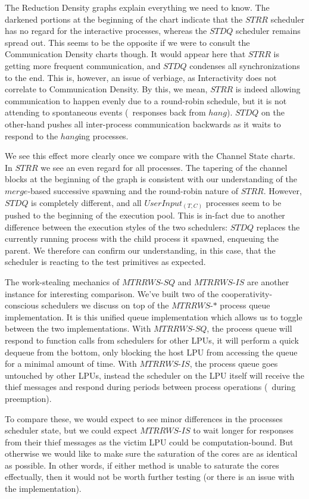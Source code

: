 The Reduction Density graphs explain everything we need to know. The darkened portions
at the beginning of the chart indicate that the $STRR$ scheduler has no regard for the
interactive processes, whereas the $STDQ$ scheduler remains spread out. This seems to be
the opposite if we were to consult the Communication Density charts though. It would appear
here that $STRR$ is getting more frequent communication, and $STDQ$ condenses all 
synchronizations to the end. This is, however, an issue of verbiage, as Interactivity
does not correlate to Communication Density. By this, we mean, $STRR$ is indeed allowing 
communication to happen evenly due to a round-robin schedule, but it is not attending to
spontaneous events (\ie~responses back from $hang$). $STDQ$ on the other-hand pushes all 
inter-process communication backwards as it waits to respond to the $hang$ing processes.

We see this effect more clearly once we compare with the Channel State charts. In $STRR$
we see an even regard for all processes. The tapering of the channel blocks at the 
beginning of the graph is consistent with our understanding of the $merge$-based
successive spawning and the round-robin nature of $STRR$. 
However, $STDQ$ is completely different, and all $UserInput_{(T,C)}$
processes seem to be pushed to the beginning of the execution pool. This is in-fact due
to another difference between the execution styles of the two schedulers: $STDQ$ replaces
the currently running process with the child process it spawned, enqueuing the parent.
We therefore can confirm our understanding, in this case, that the scheduler is reacting
to the test primitives as expected.

The work-stealing mechanics of $MTRRWS$-$SQ$ and $MTRRWS$-$IS$ are another instance for interesting comparison. We've built
two of the cooperativity-conscious schedulers we discuss on top of the $MTRRWS$-$*$ 
process queue implementation. It is this unified queue implementation which allows 
us to toggle between the two implementations. With $MTRRWS$-$SQ$, the process queue
will respond to function calls from schedulers for other LPUs, it will perform a
quick dequeue from the bottom, only blocking the host LPU from accessing the queue
for a minimal amount of time. With $MTRRWS$-$IS$, the process queue goes untouched
by other LPUs, instead the scheduler on the LPU itself will receive the thief messages
and respond during periods between process operations (\eg~during preemption).

To compare these, we would expect to see minor differences in the processes scheduler 
state, but we could expect $MTRRWS$-$IS$ to wait longer for responses from their thief
messages as the victim LPU could be computation-bound. 
But otherwise we would like to make sure the saturation of the cores are 
as identical as possible. In other words, if either method is unable to saturate the 
cores effectually, then it would not be worth further testing (or there is an issue 
with the implementation). 

